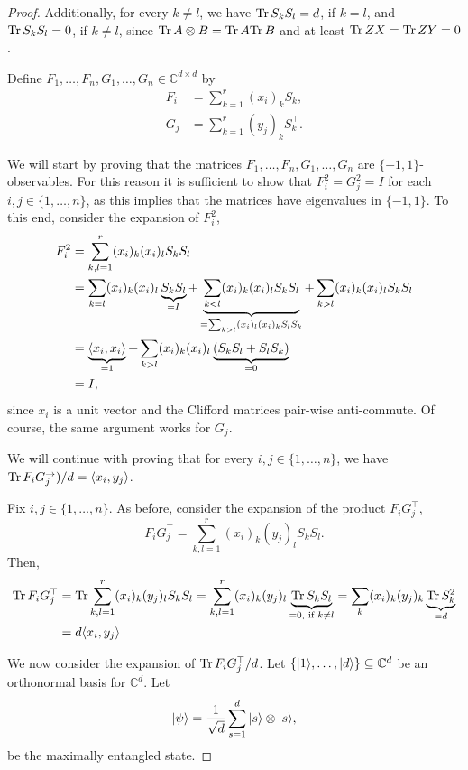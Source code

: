 \begin{proof}
	Additionally, for every $k\neq l$, we have $\text{Tr} \, {S_kS_l} =d$, if $k=l$, and $\text{Tr} \, {S_kS_l} =0$, if $k\neq l$, since $\text{Tr} \, {A\otimes B}  = \text{Tr} \, {A} \text{Tr} \, {B} $ and at least $\text{Tr} \, {ZX} =\text{Tr} \, {ZY} =0$.
	
	Define $F_1,\dots,F_n,G_1,\dots,G_n\in\mathbb{C}^{d\times d}$ by
	\begin{align}
		F_i&=\sum_{k=1}^r (x_i)_k S_k,\\
		G_j&=\sum_{k=1}^r (y_j)_k S_k^\top.
	\end{align}
	
	We will start by proving that the matrices $F_1,\dots,F_n,G_1,\dots,G_n$ are $\{-1,1\}$-observables.
	For this reason it is sufficient to show that $F_i^2=G_j^2=I$ for each $i,j\in\{1,\dots,n\}$, as this implies that the matrices have eigenvalues in $\{-1,1\}$. To this end, consider the expansion of $F_i^2$,
	\begin{align*}
		F_i^2 &= \sum_{k,l=1}^r (x_i)_k(x_i)_l S_k S_l \\
		&= \sum_{k=l} (x_i)_k(x_i)_l \underbrace{S_k S_l}_{=I} + \underbrace{\sum_{k<l} (x_i)_k(x_i)_l S_k S_l}_{=\sum_{k>l} (x_i)_l(x_i)_k S_l S_k} + \sum_{k>l} (x_i)_k(x_i)_l S_k S_l \\
		&= \underbrace{\langle{x_i},{x_i}\rangle}_{=1} + \sum_{k>l} (x_i)_k(x_i)_l \underbrace{(S_k S_l+S_l S_k)}_{=0}\\
		&= I, 
	\end{align*}
	since $x_i$ is a unit vector and the Clifford matrices pair-wise anti-commute.
	Of course, the same argument works for $G_j$.
	
	We will continue with proving that for every $i,j\in\{1,\dots,n\}$, we have $\text{Tr} \, {F_iG_j^\to} )/d=\langle{x_i},{y_j}\rangle$.
	
	Fix $i,j\in\{1,\dots,n\}$. As before, consider the expansion of the product $F_iG_j^\top$,
	\begin{equation}
		F_iG_j^\top = \sum_{k,l=1}^r (x_i)_k(y_j)_lS_kS_l.
	\end{equation}
	Then,
	\begin{align*}
		\text{Tr} \, {F_iG_j^\top}  &= \text{Tr} \, {\sum_{k,l=1}^r (x_i)_k(y_j)_lS_kS_l}  
		= \sum_{k,l=1}^r (x_i)_k(y_j)_l \underbrace{\text{Tr} \, {S_kS_l} }_{=0,\text{ if } k\neq l}
		= \sum_{k} (x_i)_k(y_j)_k \underbrace{\text{Tr} \, {S_k^2} }_{=d}\\
		&= d \langle{x_i},{y_j}\rangle 
	\end{align*}
	
	We now consider the expansion of $\text{Tr} \, {F_iG_j^\top} /d$. Let $\{\vert {1} \rangle,\dots,\vert {d} \rangle\}\subseteq \mathbb{C}^d$ be an orthonormal basis for $\mathbb{C}^d$. Let
	\begin{equation}
		\vert {\psi} \rangle = \frac{1}{\sqrt{d}} \sum_{s=1}^d \vert {s} \rangle \otimes \vert {s} \rangle,
	\end{equation}
	be the maximally entangled state. 
	

\end{proof}
